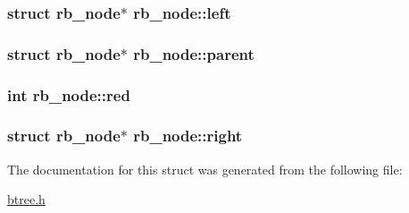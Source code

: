 \subsubsection[{left}]{\setlength{\rightskip}{0pt plus 5cm}struct {\bf rb\+\_\+node}$\ast$ rb\+\_\+node\+::left}\label{structrb__node_a4836de217511cad72a44303d7f868fa7}
\hypertarget{structrb__node_af8883b96ded96d4b743e87e5c67ebc74}{}
\subsubsection[{parent}]{\setlength{\rightskip}{0pt plus 5cm}struct {\bf rb\+\_\+node}$\ast$ rb\+\_\+node\+::parent}\label{structrb__node_af8883b96ded96d4b743e87e5c67ebc74}
\hypertarget{structrb__node_ac12d2b253512f2ee39a14fee8e07c427}{}
\subsubsection[{red}]{\setlength{\rightskip}{0pt plus 5cm}int rb\+\_\+node\+::red}\label{structrb__node_ac12d2b253512f2ee39a14fee8e07c427}
\hypertarget{structrb__node_af03024cab4c8bbc6f70391e4b4811787}{}
\subsubsection[{right}]{\setlength{\rightskip}{0pt plus 5cm}struct {\bf rb\+\_\+node}$\ast$ rb\+\_\+node\+::right}\label{structrb__node_af03024cab4c8bbc6f70391e4b4811787}


The documentation for this struct was generated from the following file\+:\begin{DoxyCompactItemize}
\item 
\hyperlink{btree_8h}{btree.\+h}\end{DoxyCompactItemize}
